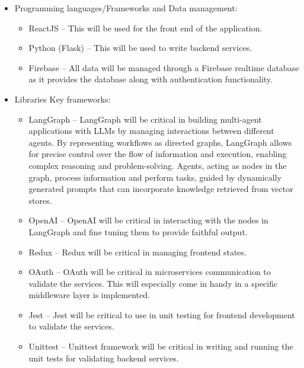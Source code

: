 \documentclass{article}
\begin{document}
\begin{itemize}
  \item Programming languages/Frameworks and Data management:
    \begin{itemize}
      \item ReactJS -- This will be used for the front end of the application.
      \item Python (Flask) -- This will be used to write backend services.
      \item Firebase -- All data will be managed through a Firebase realtime database as it provides the database along with authentication functionality.
    \end{itemize}
    

  \item Libraries
    Key frameworks:
    \begin{itemize}
      \item LangGraph -- LangGraph will be critical in building multi-agent applications with LLMs by managing interactions between different agents. By representing workflows as directed graphs, LangGraph allows for precise control over the flow of information and execution, enabling complex reasoning and problem-solving. Agents, acting as nodes in the graph, process information and perform tasks, guided by dynamically generated prompts that can incorporate knowledge retrieved from vector stores. 
      \item OpenAI -- OpenAI will be critical in interacting with the nodes in LangGraph and fine tuning them to provide faithful output.
      \item Redux -- Redux will be critical in managing frontend states.
      \item OAuth -- OAuth will be critical in microservices communication to validate the services. This will especially come in handy in a specific middleware layer is implemented.
      \item Jest -- Jest will be critical to use in unit testing for frontend development to validate the services. 
      \item Unittest -- Unittest framework will be critical in writing and running the unit tests for validating backend services.    
    \end{itemize}


\end{itemize}
\end{document}
